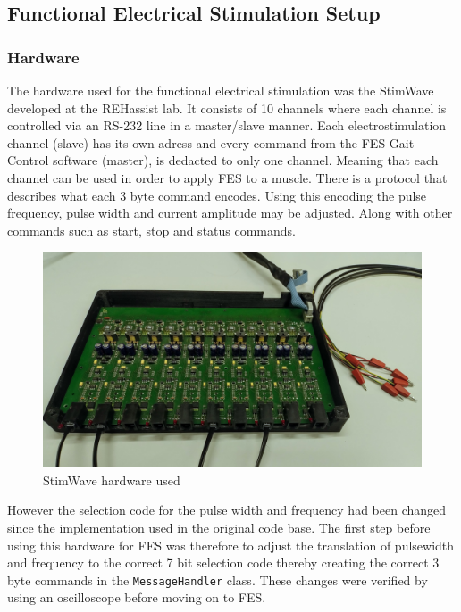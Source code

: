 \subsection{Functional Electrical Stimulation Setup}

\subsubsection{Hardware}
The hardware used for the functional electrical stimulation was the StimWave developed at the REHassist lab. It consists of 10 channels where each channel is controlled via an RS-232 line in a master/slave manner. Each electrostimulation channel (slave) has its own adress and every command from the FES Gait Control software (master), is dedacted to only one channel. Meaning that each channel can be used in order to apply FES to a muscle. There is a protocol that describes what each 3 byte command encodes. Using this encoding the pulse frequency, pulse width and current amplitude may be adjusted. Along with other commands such as start, stop and status commands. 

\begin{figure} [h]
    \centering
    \includegraphics[width=0.8\linewidth]{images/stimwave.jpg}
    \caption{StimWave hardware used}
    \label{fig:stimwave}
\end{figure}

However the selection code for the pulse width and frequency had been changed since the implementation used in the original code base. The first step before using this hardware for FES was therefore to adjust the translation of pulsewidth and frequency to the correct 7 bit selection code thereby creating the correct 3 byte commands in the \texttt{MessageHandler} class. These changes were verified by using an oscilloscope before moving on to FES. 


